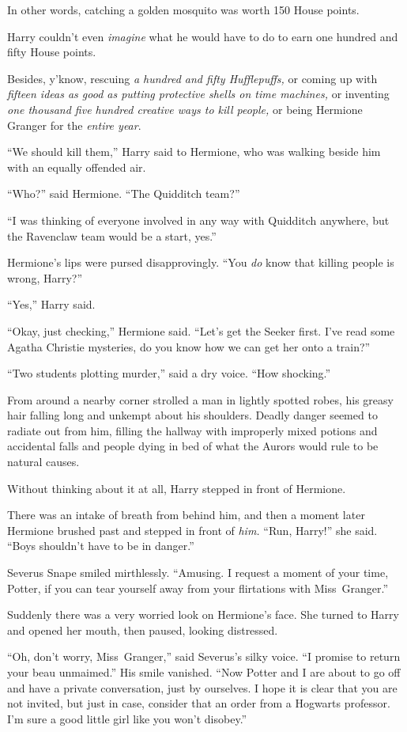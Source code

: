 In other words, catching a golden mosquito was worth 150 House points.

Harry couldn’t even \emph{imagine} what he would have to do to earn one hundred
and fifty House points.

Besides, y’know, rescuing \emph{a hundred and fifty Hufflepuffs,} or coming up
with \emph{fifteen ideas as good as putting protective shells on time
machines,} or inventing \emph{one thousand five hundred creative ways to kill
people,} or being Hermione Granger for the \emph{entire year}.

“We should kill them,” Harry said to Hermione, who was walking beside him with
an equally offended air.

“Who?” said Hermione. “The Quidditch team?”

“I was thinking of everyone involved in any way with Quidditch anywhere, but
the Ravenclaw team would be a start, yes.”

Hermione’s lips were pursed disapprovingly. “You \emph{do} know that killing
people is wrong, Harry?”

“Yes,” Harry said.

“Okay, just checking,” Hermione said. “Let’s get the Seeker first. I’ve read
some Agatha Christie mysteries, do you know how we can get her onto a train?”

“Two students plotting murder,” said a dry voice. “How shocking.”

From around a nearby corner strolled a man in lightly spotted robes, his greasy
hair falling long and unkempt about his shoulders. Deadly danger seemed to
radiate out from him, filling the hallway with improperly mixed potions and
accidental falls and people dying in bed of what the Aurors would rule to be
natural causes.

Without thinking about it at all, Harry stepped in front of Hermione.

There was an intake of breath from behind him, and then a moment later Hermione
brushed past and stepped in front of \emph{him.} “Run, Harry!” she said. “Boys
shouldn’t have to be in danger.”

Severus Snape smiled mirthlessly. “Amusing. I request a moment of your time,
Potter, if you can tear yourself away from your flirtations with Miss~Granger.”

Suddenly there was a very worried look on Hermione’s face. She turned to Harry
and opened her mouth, then paused, looking distressed.

“Oh, don’t worry, Miss~Granger,” said Severus’s silky voice. “I promise to
return your beau unmaimed.” His smile vanished. “Now Potter and I are about to
go off and have a private conversation, just by ourselves. I hope it is clear
that you are not invited, but just in case, consider that an order from a
Hogwarts professor. I’m sure a good little girl like you won’t disobey.”

